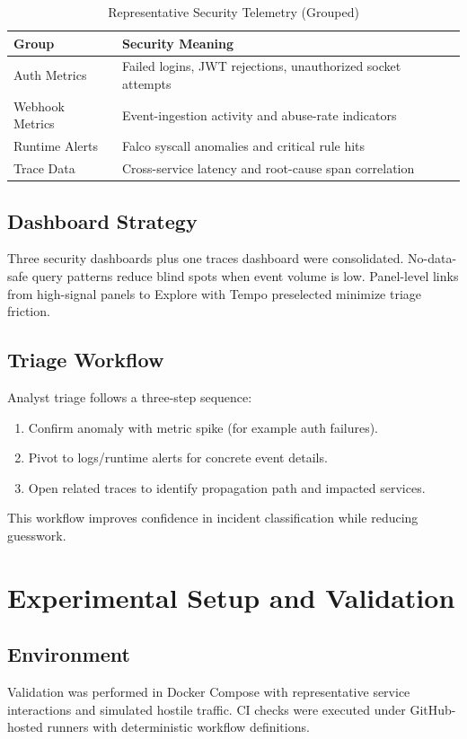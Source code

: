 \documentclass[conference]{IEEEtran}
\begin{document}
\begin{table}[!t]
\caption{Representative Security Telemetry (Grouped)}
\centering
\footnotesize
\begin{tabularx}{\linewidth}{>{\raggedright\arraybackslash}p{1.12cm} Y}
\toprule
Group & Security Meaning \\
\midrule
Auth Metrics & Failed logins, JWT rejections, unauthorized socket attempts \\
Webhook Metrics & Event-ingestion activity and abuse-rate indicators \\
Runtime Alerts & Falco syscall anomalies and critical rule hits \\
Trace Data & Cross-service latency and root-cause span correlation \\
\bottomrule
\end{tabularx}
\label{tab:telemetry}
\end{table}

\subsection{Dashboard Strategy}
Three security dashboards plus one traces dashboard were consolidated. No-data-safe query patterns reduce blind spots when event volume is low. Panel-level links from high-signal panels to Explore with Tempo preselected minimize triage friction.

\subsection{Triage Workflow}
Analyst triage follows a three-step sequence:
\begin{enumerate}
\item Confirm anomaly with metric spike (for example auth failures).
\item Pivot to logs/runtime alerts for concrete event details.
\item Open related traces to identify propagation path and impacted services.
\end{enumerate}

This workflow improves confidence in incident classification while reducing guesswork.

\section{Experimental Setup and Validation}
\subsection{Environment}
Validation was performed in Docker Compose with representative service interactions and simulated hostile traffic. CI checks were executed under GitHub-hosted runners with deterministic workflow definitions.
\end{document}
